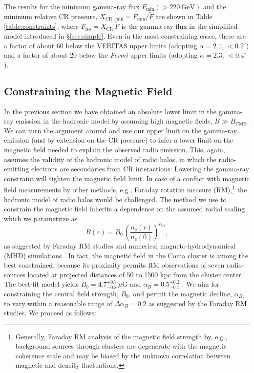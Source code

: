 \documentclass[12pt,manuscript]{aastex}
\newcommand{\rmn}{\mathrm}
\newcommand{\CR}{\mathrm{CR}}
\begin{document}
The results for the minimum gamma-ray flux $F_{\rmn{min}}(>220~\rmn{GeV})$ and the minimum relative
CR pressure, $X_{\CR,\,\rmn{min}} = F_{\rmn{min}}/\tilde{F}$ are shown in Table
\ref{table:constraints}, where $F_\rmn{iso} = X_\CR\,\tilde{F}$ is the gamma-ray flux in the simplified
model introduced in \S\ref{sec:simple}. Even in the most constraining cases,
these are a factor of about 60 below the VERITAS upper limits (adopting $\alpha=2.1$,
$<0.2^{\circ}$) and a factor of about 20 below the {\em Fermi} upper limits (adopting $\alpha=2.3$,
$<0.4^{\circ}$).

%
%
 
\subsection{Constraining the Magnetic Field}
\label{sec:B}
In the previous section we have obtained an absolute lower limit in the gamma-ray emission in
the hadronic model by assuming high magnetic fields, $B\gg B_\rmn{CMB}$. We can turn the
argument around and use our upper limit on the gamma-ray emission (and by extension on the
CR pressure) to infer a lower limit on the magnetic field needed to explain the observed radio
emission. This, again, assumes the validity of the hadronic model of radio halos, in which the
radio-emitting electrons are secondaries from CR interactions. Lowering the gamma-ray
constraint will tighten the magnetic field limit. In case of a conflict with magnetic field
measurements by other methods, e.g., Faraday rotation measure (RM),\footnote{Generally,
Faraday RM analysis of the magnetic field strength by, e.g., background sources through
clusters are degenerate with the magnetic coherence scale and may be biased by the unknown
correlation between magnetic and density fluctuations.} the hadronic model of radio halos would
be challenged. The method we use to constrain the magnetic field inherits a dependence on
the assumed radial scaling which we parametrize as
\begin{equation}
\label{eq:B}
B(r) = B_{0} \,\left(\frac{n_{\rmn{e}}(r)}{n_{\rmn{e}}(0)}\right)^{\alpha_B},
\end{equation}
as suggested by Faraday RM studies and numerical magneto-hydrodynamical (MHD) simulations
\citep[][and references therein]{article:Bonafede_etal:2010, article:Bonafede_etal:2011}. In fact,
the magnetic field in the Coma cluster is among the best constrained, because its proximity permits
RM observations of seven radio-sources located at projected distances of 50 to 1500 kpc from the
cluster center. The best-fit model yields $B_{0} = 4.7^{+0.7}_{-0.8}\,\mu$G and
$\alpha_{B} = 0.5^{+0.2}_{-0.1}$ \citep{article:Bonafede_etal:2010}. We aim for constraining the
central field strength, $B_{0}$, and permit the magnetic decline, $\alpha_{B}$, to vary
within a reasonable range of $\Delta\alpha_{B}=0.2$ as suggested by the Faraday RM studies.
We proceed as follows:
\end{document}
